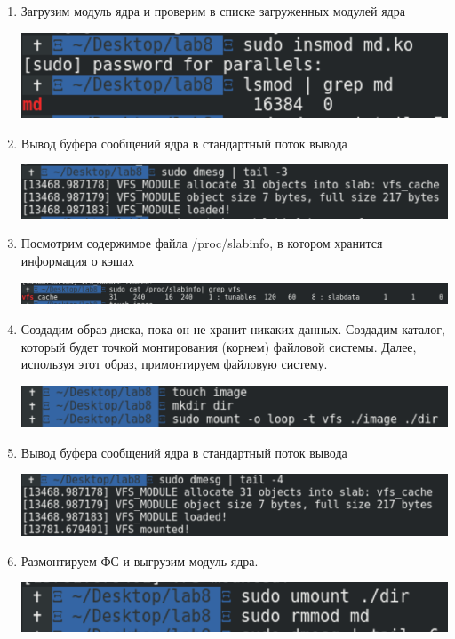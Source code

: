 \documentclass[a4paper,14pt]{extreport} %
\begin{document}
\begin{enumerate}
\item Загрузим модуль ядра и проверим в списке загруженных модулей ядра

\includegraphics[scale=0.8]{1}

\item Вывод буфера сообщений ядра в стандартный поток вывода

\includegraphics[scale=0.8]{2}

\item Посмотрим содержимое файла /proc/slabinfo, в котором хранится информация о кэшах

\includegraphics[scale=0.5]{3}

\item Создадим образ диска, пока он не хранит никаких данных. Создадим каталог, который будет точкой монтирования (корнем) файловой системы. Далее, используя этот образ, примонтируем файловую систему. 

\includegraphics[scale=0.8]{4}

\item Вывод буфера сообщений ядра в стандартный поток вывода

\includegraphics[scale=0.8]{5}

\item Размонтируем ФС и выгрузим модуль ядра. 

\includegraphics[scale=0.8]{6}


\end{enumerate}
\end{document}
